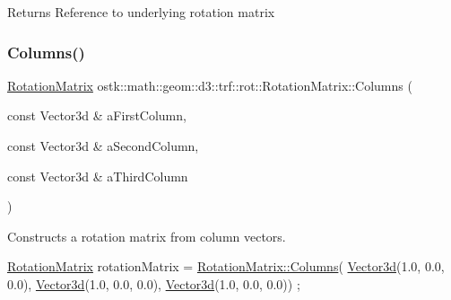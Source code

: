 \begin{DoxyReturn}{Returns}
Reference to underlying rotation matrix 
\end{DoxyReturn}
\mbox{\label{classostk_1_1math_1_1geom_1_1d3_1_1trf_1_1rot_1_1_rotation_matrix_a244f95ea8a4298e92a9d927f9b8caa72}} 
\subsubsection{\texorpdfstring{Columns()}{Columns()}}
{\footnotesize\ttfamily \hyperlink{classostk_1_1math_1_1geom_1_1d3_1_1trf_1_1rot_1_1_rotation_matrix}{Rotation\+Matrix} ostk\+::math\+::geom\+::d3\+::trf\+::rot\+::\+Rotation\+Matrix\+::\+Columns (\begin{DoxyParamCaption}\item[{const Vector3d \&}]{a\+First\+Column,  }\item[{const Vector3d \&}]{a\+Second\+Column,  }\item[{const Vector3d \&}]{a\+Third\+Column }\end{DoxyParamCaption})\hspace{0.3cm}{\ttfamily [static]}}



Constructs a rotation matrix from column vectors. 


\begin{DoxyCode}
\hyperlink{classostk_1_1math_1_1geom_1_1d3_1_1trf_1_1rot_1_1_rotation_matrix_a5e6bed0779ad7db0c5bf26b2bd96f8ba}{RotationMatrix} rotationMatrix = \hyperlink{classostk_1_1math_1_1geom_1_1d3_1_1trf_1_1rot_1_1_rotation_matrix_a244f95ea8a4298e92a9d927f9b8caa72}{RotationMatrix::Columns}(
      \hyperlink{namespaceostk_1_1math_1_1obj_a18744cbf433bce59f6758d9fe3b1dff1}{Vector3d}(1.0, 0.0, 0.0), \hyperlink{namespaceostk_1_1math_1_1obj_a18744cbf433bce59f6758d9fe3b1dff1}{Vector3d}(1.0, 0.0, 0.0), \hyperlink{namespaceostk_1_1math_1_1obj_a18744cbf433bce59f6758d9fe3b1dff1}{Vector3d}(1.0, 0.0, 0.0)) ;
\end{DoxyCode}



